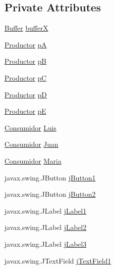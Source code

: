 \subsection*{Private Attributes}
\begin{DoxyCompactItemize}
\item 
\mbox{\hyperlink{class_ejercicio2_1_1_buffer}{Buffer}} \mbox{\hyperlink{class_ejercicio2_1_1_buffer_interfaz_a53107ffeb83ad39dffdd24c9a407e67e}{bufferX}}
\item 
\mbox{\hyperlink{class_ejercicio2_1_1_productor}{Productor}} \mbox{\hyperlink{class_ejercicio2_1_1_buffer_interfaz_a4c656d5f1223294683178ad24f8c3fa1}{pA}}
\item 
\mbox{\hyperlink{class_ejercicio2_1_1_productor}{Productor}} \mbox{\hyperlink{class_ejercicio2_1_1_buffer_interfaz_a844da0419730d90cc3d20549a3d6c840}{pB}}
\item 
\mbox{\hyperlink{class_ejercicio2_1_1_productor}{Productor}} \mbox{\hyperlink{class_ejercicio2_1_1_buffer_interfaz_a598f50ad3180df0873baf164c96ff4b0}{pC}}
\item 
\mbox{\hyperlink{class_ejercicio2_1_1_productor}{Productor}} \mbox{\hyperlink{class_ejercicio2_1_1_buffer_interfaz_a96002d44eb72523566a53020398c2d18}{pD}}
\item 
\mbox{\hyperlink{class_ejercicio2_1_1_productor}{Productor}} \mbox{\hyperlink{class_ejercicio2_1_1_buffer_interfaz_ab2940bb6ba9b5b1ab9ed270822f9ac02}{pE}}
\item 
\mbox{\hyperlink{class_ejercicio2_1_1_consumidor}{Consumidor}} \mbox{\hyperlink{class_ejercicio2_1_1_buffer_interfaz_a351ede1cadc154a8baa884f648da3a9f}{Luis}}
\item 
\mbox{\hyperlink{class_ejercicio2_1_1_consumidor}{Consumidor}} \mbox{\hyperlink{class_ejercicio2_1_1_buffer_interfaz_add59e765dfa159c7f2d3c4e2e02458b7}{Juan}}
\item 
\mbox{\hyperlink{class_ejercicio2_1_1_consumidor}{Consumidor}} \mbox{\hyperlink{class_ejercicio2_1_1_buffer_interfaz_adce3b96e30b916c4092f6819c0f18c4c}{Maria}}
\item 
javax.\+swing.\+J\+Button \mbox{\hyperlink{class_ejercicio2_1_1_buffer_interfaz_a1ec51a96e127bf42cda327fbfeb2a518}{j\+Button1}}
\item 
javax.\+swing.\+J\+Button \mbox{\hyperlink{class_ejercicio2_1_1_buffer_interfaz_a0c2d3a8ae39447836ea6faf16fb98ec3}{j\+Button2}}
\item 
javax.\+swing.\+J\+Label \mbox{\hyperlink{class_ejercicio2_1_1_buffer_interfaz_adc7aca7314d0fe3c8cbe793a812d21b2}{j\+Label1}}
\item 
javax.\+swing.\+J\+Label \mbox{\hyperlink{class_ejercicio2_1_1_buffer_interfaz_ac8adb3eda942e75c690374fafc43eee2}{j\+Label2}}
\item 
javax.\+swing.\+J\+Label \mbox{\hyperlink{class_ejercicio2_1_1_buffer_interfaz_ab11594779db262d4fc72c8c1515b7fd9}{j\+Label3}}
\item 
javax.\+swing.\+J\+Text\+Field \mbox{\hyperlink{class_ejercicio2_1_1_buffer_interfaz_a2cfe0e22bb31e597087955036f69b34a}{j\+Text\+Field1}}
\end{DoxyCompactItemize}


